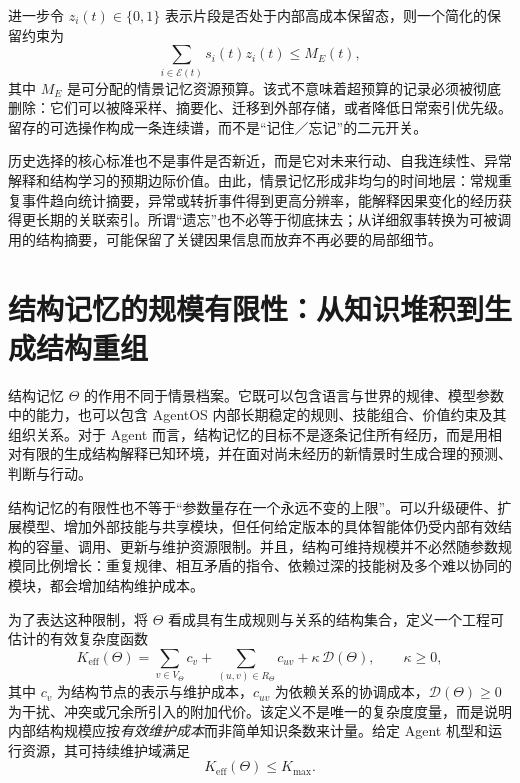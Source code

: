 进一步令 $z_i(t)\in\{0,1\}$ 表示片段是否处于内部高成本保留态，则一个简化的保留约束为
\begin{equation}
 \label{eq:episodic-budget}
 \sum_{i\in\mathcal E(t)} s_i(t)z_i(t)\le M_E(t),
\end{equation}
其中 $M_E$ 是可分配的情景记忆资源预算。该式不意味着超预算的记录必须被彻底删除：它们可以被降采样、摘要化、迁移到外部存储，或者降低日常索引优先级。留存的可选操作构成一条连续谱，而不是“记住／忘记”的二元开关。

历史选择的核心标准也不是事件是否新近，而是它对未来行动、自我连续性、异常解释和结构学习的预期边际价值。由此，情景记忆形成非均匀的时间地层：常规重复事件趋向统计摘要，异常或转折事件得到更高分辨率，能解释因果变化的经历获得更长期的关联索引。所谓“遗忘”也不必等于彻底抹去；从详细叙事转换为可被调用的结构摘要，可能保留了关键因果信息而放弃不再必要的局部细节。

\section{结构记忆的规模有限性：从知识堆积到生成结构重组}
\label{sec:theta-finitude}

结构记忆 $\Theta$ 的作用不同于情景档案。它既可以包含语言与世界的规律、模型参数中的能力，也可以包含 AgentOS 内部长期稳定的规则、技能组合、价值约束及其组织关系。对于 Agent 而言，结构记忆的目标不是逐条记住所有经历，而是用相对有限的生成结构解释已知环境，并在面对尚未经历的新情景时生成合理的预测、判断与行动。

结构记忆的有限性也不等于“参数量存在一个永远不变的上限”。可以升级硬件、扩展模型、增加外部技能与共享模块，但任何给定版本的具体智能体仍受内部有效结构的容量、调用、更新与维护资源限制。并且，结构可维持规模并不必然随参数规模同比例增长：重复规律、相互矛盾的指令、依赖过深的技能树及多个难以协同的模块，都会增加结构维护成本。

为了表达这种限制，将 $\Theta$ 看成具有生成规则与关系的结构集合，定义一个工程可估计的有效复杂度函数
\begin{equation}
 \label{eq:theta-complexity}
 K_{\mathrm{eff}}(\Theta)
 =\sum_{v\in V_{\Theta}}c_v
 +\sum_{(u,v)\in R_{\Theta}}c_{uv}
 +\kappa\,\mathcal D(\Theta),\qquad \kappa\ge0,
\end{equation}
其中 $c_v$ 为结构节点的表示与维护成本，$c_{uv}$ 为依赖关系的协调成本，$\mathcal D(\Theta)\ge0$ 为干扰、冲突或冗余所引入的附加代价。该定义不是唯一的复杂度度量，而是说明内部结构规模应按\emph{有效维护成本}而非简单知识条数来计量。给定 Agent 机型和运行资源，其可持续维护域满足
\begin{equation}
 \label{eq:theta-limit}
 K_{\mathrm{eff}}(\Theta)\le K_{\max}.
\end{equation}

